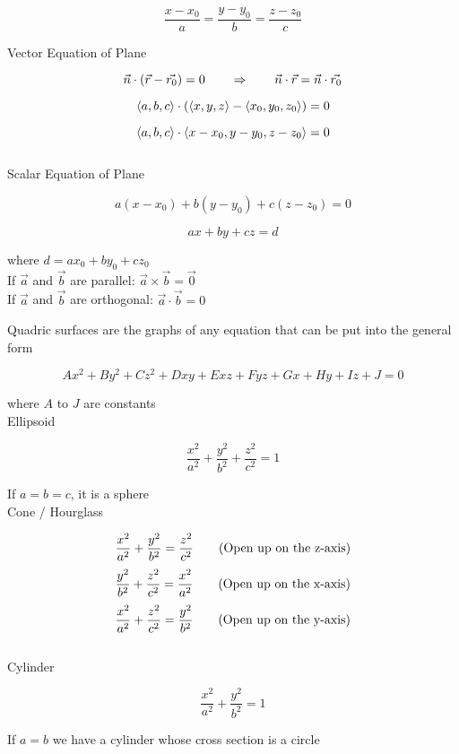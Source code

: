 \documentclass[11pt]{article}
\begin{document}
\[ \frac{x-x_{0}}{a}=\frac{y-y_{0}}{b}=\frac{z-z_{0}}{c} \]


Vector Equation of Plane

\[ \vec{n} \cdot (\vec{r}-\vec{r_{0}}) = 0 \qquad \Rightarrow \qquad \vec{n} \cdot \vec{r} = \vec{n}\cdot \vec{r_{0}} \]

\[ \langle {a,b,c} \rangle\cdot (\langle {x,y,z} \rangle-\langle {x_{0},y_{0},z_{0}} \rangle) = 0 \] 

\[ \langle {a,b,c} \rangle\cdot\langle {x-x_{0},y-y_{0},z-z_{0}} \rangle = 0 \] \\

Scalar Equation of Plane

\[ a(x-x_{0})+b(y-y_{0})+c(z-z_{0})=0 \]

\[ ax+by+cz=d\]

where $d=ax_{0}+by_{0}+cz_{0}$ \\

If $\vec{a}$ and $\vec{b}$ are parallel: $\vec{a}\times\vec{b}=\vec{0}$ \\

If $\vec{a}$ and $\vec{b}$ are orthogonal: $\vec{a}\cdot\vec{b}=0$ \\


Quadric surfaces are the graphs of any equation that can be put into the general form

\[ Ax^{2}+By^{2}+Cz^{2}+Dxy+Exz+Fyz+Gx+Hy+Iz+J=0 \]

where $A$ to $J$ are constants \\

Ellipsoid

\[\frac{x^{2}}{a^{2}}+\frac{y^{2}}{b^{2}}+\frac{z^{2}}{c^{2}} = 1\] 

If $a=b=c$, it is a sphere \\

Cone / Hourglass

\[ \frac{x^{2}}{a^{2}} + \frac{y^{2}}{b^{2}} = \frac{z^{2}}{c^{2}} \qquad \text{(Open up on the z-axis)} \]
\[ \frac{y^{2}}{b^{2}} + \frac{z^{2}}{c^{2}} = \frac{x^{2}}{a^{2}} \qquad \text{(Open up on the x-axis)} \]
\[ \frac{x^{2}}{a^{2}} + \frac{z^{2}}{c^{2}} = \frac{y^{2}}{b^{2}} \qquad \text{(Open up on the y-axis)} \] \\

Cylinder

\[ \frac{x^{2}}{a^{2}}+\frac{y^{2}}{b^{2}}=1\]

If $a=b$ we have a cylinder whose cross section is a circle
\end{document}
